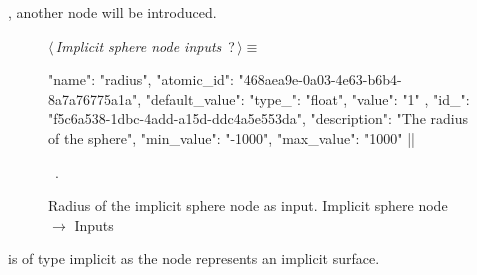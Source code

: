 \documentclass[%
    a4paper,    %
    justified,  %
    nobib,      %
    openany     %
]{tufte-book}
\makeatletter
\renewcommand{\label}[1]{\@tufte@label{##1}}%
\makeatother
\begin{document}
, another node will be
introduced.

\begin{figure}
\begin{flushleft} \small
\begin{minipage}{\linewidth}\label{scrap100}\raggedright\small
{} $\langle\,${\itshape Implicit sphere node inputs}\nobreak\ {\footnotesize {?}}$\,\rangle\equiv$
\vspace{-1ex}
\begin{pythoncode}
{
    "name": "radius",
    "atomic_id": "468aea9e-0a03-4e63-b6b4-8a7a76775a1a",
    "default_value": {
        "type_": "float",
        "value": "1"
    },
    "id_": "f5c6a538-1dbc-4add-a15d-ddc4a5e553da",
    "description": "The radius of the sphere",
    "min_value": "-1000",
    "max_value": "1000"
}|\NWsep|
\end{pythoncode}
\vspace{1.5ex}
\footnotesize
\begin{list}{}{\setlength{\itemsep}{-\parsep}\setlength{\itemindent}{-\leftmargin}}
\item \NWtxtMacroRefIn\ .

\item{}
\end{list}
\end{minipage}\vspace{4ex}
\end{flushleft}
\caption{Radius of the implicit sphere node as input.
  \newline{}\newline{}Implicit sphere node $\rightarrow$ Inputs}
\label{editor:lst:nodes:sphere-node:inputs:radius}
\end{figure}

 is of type implicit as the node
represents an implicit surface.
\end{document}
